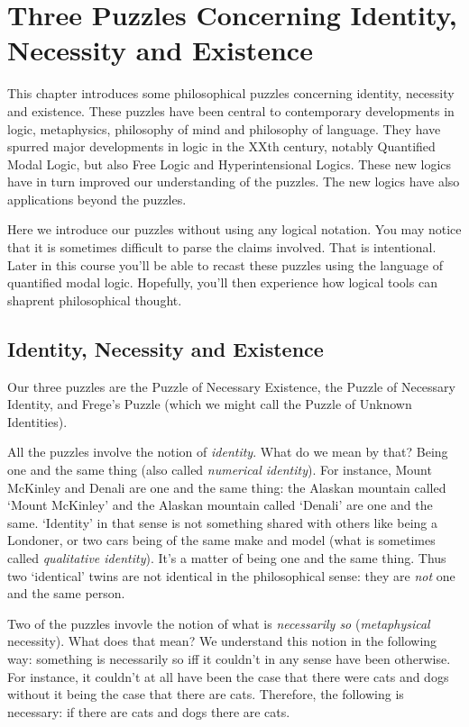 \documentclass[../../../include/open-logic-chapter]{subfiles}
\begin{document}

\chapter{Three Puzzles Concerning Identity, Necessity and Existence}

This chapter introduces some philosophical puzzles concerning 
identity, necessity and existence. These puzzles have been
central to contemporary developments in logic, metaphysics, 
philosophy of mind and philosophy of language. 
They have spurred major developments in logic in the XXth century,
notably Quantified Modal Logic, but also Free Logic and Hyperintensional
Logics. These new logics have in turn improved our understanding 
of the puzzles. The new logics have also applications beyond the puzzles.

Here we introduce our puzzles without using any logical notation. 
You may notice that it is sometimes difficult to parse the claims
involved. That is intentional. Later in this course you'll be able 
to recast these puzzles using the language of quantified modal logic. 
Hopefully, you'll then experience how logical tools can shaprent philosophical thought.   

\section{Identity, Necessity and Existence}

Our three puzzles are the Puzzle of Necessary Existence,
the Puzzle of Necessary Identity, and Frege's Puzzle (which we 
might call the Puzzle of Unknown Identities).

All the puzzles involve the notion of \emph{identity}. What do we mean
by that? Being one and the same thing (also called \emph{numerical
identity}). For instance, Mount McKinley and Denali are one and the
same thing: the Alaskan mountain called `Mount McKinley' and the
Alaskan mountain called `Denali' are one and the same. `Identity' in
that sense is not something shared with others like being a Londoner,
or two cars being of the same make and model (what is sometimes called
\emph{qualitative identity}). It's a matter of being one and the same
thing. Thus two `identical' twins are not identical in the
philosophical sense: they are \emph{not} one and the same person.

Two of the puzzles invovle the notion of what is \emph{necessarily so} 
(\emph{metaphysical} necessity). What does that mean? We understand this notion in the 
following way: something is necessarily so iff it couldn't in any sense 
have been otherwise. For instance, it couldn't at all have been the 
case that there were cats and dogs without it being the case 
that there are cats. Therefore, the following is necessary: if there are
cats and dogs there are cats.
\end{document}

